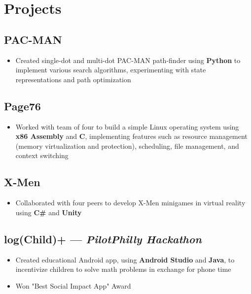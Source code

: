 \documentclass[9pt]{extarticle}
\begin{document}
\begin{minipage}[t]{.7\textwidth}
    \section{Projects}
    \vspace{0.5em}
    \subsection{PAC-MAN}%
    \begin{itemize}
        \setlength\itemsep{1dd}
        \item Created single-dot and multi-dot PAC-MAN path-finder using \textbf{Python} to implement various search algorithms, experimenting with state representations and path optimization
    \end{itemize}

    \subsection{Page76}%
    \begin{itemize}
        \setlength\itemsep{1dd}
        \item Worked with team of four to build a simple Linux operating system using \textbf{x86 Assembly} and \textbf{C},
            implementing features such as resource management (memory virtualization and protection), scheduling,
            file management, and context switching
    \end{itemize}

    \subsection{X-Men}
    \begin{itemize}
        \setlength\itemsep{1dd}
        \item Collaborated with four peers to develop X-Men minigames in virtual reality using \textbf{C\#} and \textbf{Unity}
    \end{itemize}

    \subsection{log(Child)+ --- \textit{PilotPhilly Hackathon}}
    \begin{itemize}
        \setlength\itemsep{1dd}
        \item Created educational Android app, using \textbf{Android Studio} and \textbf{Java}, to incentivize children to solve math problems in exchange for phone time
        \item Won "Best Social Impact App" Award
    \end{itemize}


\end{minipage}
\end{document}
